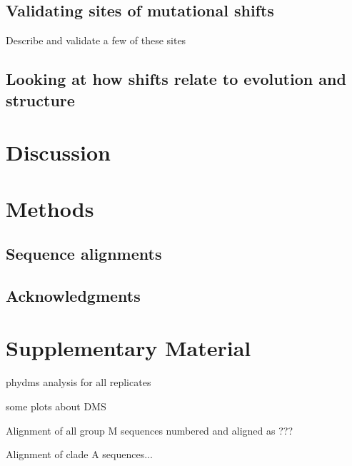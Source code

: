 \documentclass[12pt]{article}
\begin{document}
\subsection*{Validating sites of mutational shifts}
Describe and validate a few of these sites

\subsection*{Looking at how shifts relate to evolution and structure}

\section*{Discussion}

\section*{Methods}

\subsection*{Sequence alignments}

\subsection*{Acknowledgments}





\clearpage
\normalsize

\section*{Supplementary Material}

\begin{supptab}
\caption{\label{supptab:phydms_replicates}
phydms analysis for all replicates
}
\end{supptab}

\begin{suppfig}
\caption{\label{suppfig:dms}
some plots about DMS
}
\end{suppfig}

\begin{suppfile}
\caption{\label{suppfile:grpM}
Alignment of all group M sequences numbered and aligned as ???
}
\end{suppfile}

\begin{suppfile}
\caption{\label{suppfile:cladeA}
Alignment of clade A sequences...
}
\end{suppfile}
\end{document}
